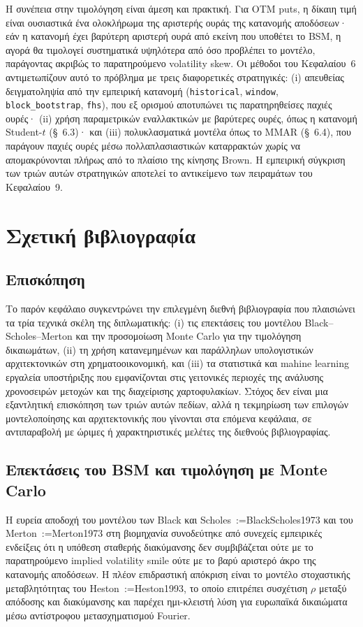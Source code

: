 \documentclass[12pt]{article}
\makeatletter
\newcommand{\citeyear}[1]{\@for\@tempa:=#1\do{\@ifundefined{cy@\@tempa}{(\@tempa)}{(\csname cy@\@tempa\endcsname)}}}
\makeatother
\begin{document}
Η συνέπεια στην τιμολόγηση είναι άμεση και πρακτική. Για OTM puts, η δίκαιη τιμή είναι ουσιαστικά ένα ολοκλήρωμα της αριστερής ουράς της κατανομής αποδόσεων· εάν η κατανομή έχει βαρύτερη αριστερή ουρά από εκείνη που υποθέτει το BSM, η αγορά θα τιμολογεί συστηματικά υψηλότερα από όσο προβλέπει το μοντέλο, παράγοντας ακριβώς το παρατηρούμενο volatility skew. Οι μέθοδοι του Κεφαλαίου~6 αντιμετωπίζουν αυτό το πρόβλημα με τρεις διαφορετικές στρατηγικές: (i) απευθείας δειγματοληψία από την εμπειρική κατανομή (\texttt{historical}, \texttt{window}, \texttt{block\_bootstrap}, \texttt{fhs}), που εξ ορισμού αποτυπώνει τις παρατηρηθείσες παχιές ουρές· (ii) χρήση παραμετρικών εναλλακτικών με βαρύτερες ουρές, όπως η κατανομή Student-$t$ (\S~6.3)· και (iii) πολυκλασματικά μοντέλα όπως το MMAR (\S~6.4), που παράγουν παχιές ουρές μέσω πολλαπλασιαστικών καταρρακτών χωρίς να απομακρύνονται πλήρως από το πλαίσιο της κίνησης Brown. Η εμπειρική σύγκριση των τριών αυτών στρατηγικών αποτελεί το αντικείμενο των πειραμάτων του Κεφαλαίου~9.

\newpage

\section{Σχετική βιβλιογραφία}

\subsection{Επισκόπηση}
Το παρόν κεφάλαιο συγκεντρώνει την επιλεγμένη διεθνή βιβλιογραφία που πλαισιώνει τα τρία τεχνικά σκέλη της διπλωματικής: (i) τις επεκτάσεις του μοντέλου Black–Scholes–Merton και την προσομοίωση Monte Carlo για την τιμολόγηση δικαιωμάτων, (ii) τη χρήση κατανεμημένων και παράλληλων υπολογιστικών αρχιτεκτονικών στη χρηματοοικονομική, και (iii) τα στατιστικά και mahine learning εργαλεία υποστήριξης που εμφανίζονται στις γειτονικές περιοχές της ανάλυσης χρονοσειρών μετοχών και της διαχείρισης χαρτοφυλακίων. Στόχος δεν είναι μια εξαντλητική επισκόπηση των τριών αυτών πεδίων, αλλά η τεκμηρίωση των επιλογών μοντελοποίησης και αρχιτεκτονικής που γίνονται στα επόμενα κεφάλαια, σε αντιπαραβολή με ώριμες ή χαρακτηριστικές μελέτες της διεθνούς βιβλιογραφίας.

\subsection{Επεκτάσεις του BSM και τιμολόγηση με Monte Carlo}
Η ευρεία αποδοχή του μοντέλου των Black και Scholes~\citeyear{BlackScholes1973} και του Merton~\citeyear{Merton1973} στη βιομηχανία συνοδεύτηκε από συνεχείς εμπειρικές ενδείξεις ότι η υπόθεση σταθερής διακύμανσης δεν συμβιβάζεται ούτε με το παρατηρούμενο implied volatility smile ούτε με το βαρύ αριστερό άκρο της κατανομής αποδόσεων. Η πλέον επιδραστική απόκριση είναι το μοντέλο στοχαστικής μεταβλητότητας του Heston~\citeyear{Heston1993}, το οποίο επιτρέπει συσχέτιση $\rho$ μεταξύ απόδοσης και διακύμανσης και παρέχει ημι-κλειστή λύση για ευρωπαϊκά δικαιώματα μέσω αντίστροφου μετασχηματισμού Fourier.
\end{document}
